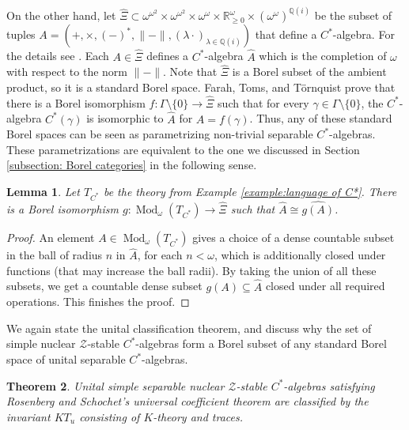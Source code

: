 \documentclass[12pt]{amsart}
\newtheorem{theorem}{Theorem}[section]
\newtheorem{lemma}[theorem]{Lemma}
\DeclareMathOperator{\Mod}{Mod}
\newcommand{\cZ}{\mathcal{Z}}
\begin{document}
On the other hand, let $\widehat{\Xi} \subset \omega^{\omega^2} \times \omega^{\omega^2} \times \omega^{\omega} \times \mathbb{R}_{\geq 0}^{\omega} \times (\omega^{\omega})^{\mathbb{Q}(i)}$ be the subset of tuples $A =(+,\times, (-)^*,\|-\|,(\lambda \cdot)_{\lambda \in \mathbb{Q}(i)})$ that define a $C^*$-algebra. 
For the details see \cite[Section 2.4]{Farahturbulence2014}. 
Each $A \in \widehat{\Xi}$ defines a $C^*$-algebra $\widehat{A}$ which is the completion of $\omega$ with respect to the norm $\|-\|$. 
Note that $\widehat{\Xi}$ is a Borel subset of the ambient product, so it is a standard Borel space. 
Farah, Toms, and Törnquist prove that there is a Borel isomorphism $f \colon \Gamma \setminus \{0\} \to \widehat{\Xi}$ such that for every $\gamma \in \Gamma \setminus \{0\}$, the $C^*$-algebra $C^*(\gamma)$ is isomorphic to $\widehat{A}$ for $A = f(\gamma)$. 
Thus, any of these standard Borel spaces can be seen as parametrizing non-trivial separable $C^*$-algebras. These parametrizations are equivalent to the one we discussed in Section \ref{subsection: Borel categories} in the following sense.

\begin{lemma}\label{lemma:our presentation of C* is equivalent to the standard one}
    Let $T_{C^*}$ be the theory from Example \ref{example:language of C*}. There is a Borel isomorphism $g:\Mod_{\omega}(T_{C^*}) \to \widehat{\Xi}$ such that $\widehat{A} \cong \widehat{g(A)}$. 
\end{lemma}
\begin{proof}
    An element $A \in \Mod_{\omega}(T_{C^*})$ gives a choice of a dense countable subset in the ball of radius $n$ in $\widehat{A}$, for each $n<\omega$, which is additionally closed under functions (that may increase the ball radii). 
    By taking the union of all these subsets, we get a countable dense subset $g(A) \subseteq \widehat{A}$ closed under all required operations. 
    This finishes the proof. 
\end{proof}


We again state the unital classification theorem, and discuss why the set of simple nuclear $\cZ$-stable $C^*$-algebras form a Borel subset of any standard Borel space of unital separable $C^*$-algebras.

\begin{theorem} \label{thm: classification of C*-algebras}
Unital simple separable nuclear $\cZ$-stable $C^*$-algebras satisfying Rosenberg and Schochet’s universal coefficient theorem are classified by the invariant $KT_u$ consisting of $K$-theory and traces.
\end{theorem}
\end{document}

